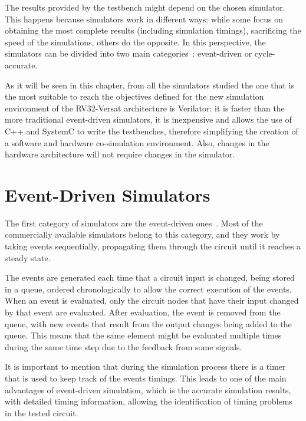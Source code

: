 The results provided by the testbench might depend on the chosen simulator. This
happens because simulators work in different ways: while some focus on obtaining
the most complete results (including simulation timings), sacrificing the speed
of the simulations, others do the opposite. In this perspective, the simulators
can be divided into two main categories~\cite{tan:vhstas,palnitkar:verilog}:
event-driven or cycle-accurate.

As it will be seen in this chapter, from all the simulators studied the one that
is the most suitable to reach the objectives defined for the new simulation
environment of the RV32-Versat architecture is Verilator: it is faster than the
more traditional event-driven simulators, it is inexpensive and allows the use
of C++ and SystemC to write the testbenches, therefore simplifying the creation
of a software and hardware co-simulation environment. Also, changes in the
hardware architecture will not require changes in the simulator.

\section{Event-Driven Simulators}
\label{section:event}

The first category of simulators are the event-driven
ones~\cite{tan:vhstas,gunes:survey,palnitkar:verilog}. Most of the commercially available 
simulators belong to this category, and they work by taking events sequentially, 
propagating them through the circuit until it reaches a steady state.

The events are generated each time that a circuit input is changed, being stored
in a queue, ordered chronologically to allow the correct execution of the
events. When an event is evaluated, only the circuit nodes that have their input
changed by that event are evaluated. After evaluation, the event is removed from
the queue, with new events that result from the output changes being added to
the queue. This means that the same element might be evaluated multiple times
during the same time step due to the feedback from some signals.

It is important to mention that during the simulation process there is a timer
that is used to keep track of the events timings. This leads to one of the main
advantages of event-driven simulation, which is the accurate simulation results,
with detailed timing information, allowing the identification of timing problems
in the tested circuit.

